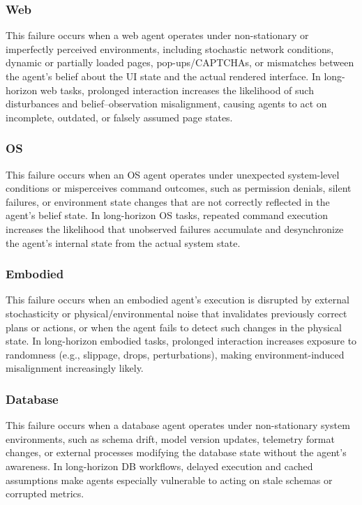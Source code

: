 \documentclass[11pt]{article}
\begin{document}
\subsubsection{Web}
This failure occurs when a web agent operates under non-stationary or imperfectly perceived environments, including stochastic network conditions, dynamic or partially loaded pages, pop-ups/CAPTCHAs, or mismatches between the agent’s belief about the UI state and the actual rendered interface. In long-horizon web tasks, prolonged interaction increases the likelihood of such disturbances and belief–observation misalignment, causing agents to act on incomplete, outdated, or falsely assumed page states.

\subsubsection{OS}
This failure occurs when an OS agent operates under unexpected system-level conditions or misperceives command outcomes, such as permission denials, silent failures, or environment state changes that are not correctly reflected in the agent’s belief state. In long-horizon OS tasks, repeated command execution increases the likelihood that unobserved failures accumulate and desynchronize the agent’s internal state from the actual system state.

\subsubsection{Embodied} This failure occurs when an embodied agent’s execution is disrupted by external stochasticity or physical/environmental noise that invalidates previously correct plans or actions, or when the agent fails to detect such changes in the physical state. In long-horizon embodied tasks, prolonged interaction increases exposure to randomness (e.g., slippage, drops, perturbations), making environment-induced misalignment increasingly likely.

\subsubsection{Database}
This failure occurs when a database agent operates under non-stationary system environments, such as schema drift, model version updates, telemetry format changes, or external processes modifying the database state without the agent’s awareness. In long-horizon DB workflows, delayed execution and cached assumptions make agents especially vulnerable to acting on stale schemas or corrupted metrics.
\end{document}

